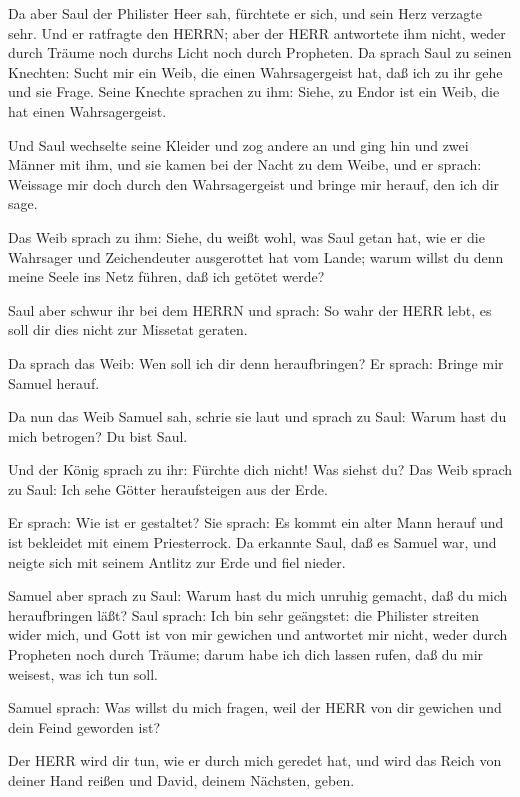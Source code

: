  Da aber Saul der Philister Heer sah, fürchtete er sich, und
sein Herz verzagte sehr.  Und er ratfragte den HERRN; aber
der HERR antwortete ihm nicht, weder durch Träume noch durchs Licht noch
durch Propheten.  Da sprach Saul zu seinen Knechten: Sucht
mir ein Weib, die einen Wahrsagergeist hat, daß ich zu ihr gehe und sie
Frage. Seine Knechte sprachen zu ihm: Siehe, zu Endor ist ein Weib, die
hat einen Wahrsagergeist.

 Und Saul wechselte seine Kleider und zog andere an und ging
hin und zwei Männer mit ihm, und sie kamen bei der Nacht zu dem Weibe,
und er sprach: Weissage mir doch durch den Wahrsagergeist und bringe mir
herauf, den ich dir sage.

 Das Weib sprach zu ihm: Siehe, du weißt wohl, was Saul
getan hat, wie er die Wahrsager und Zeichendeuter ausgerottet hat vom
Lande; warum willst du denn meine Seele ins Netz führen, daß ich getötet
werde?

 Saul aber schwur ihr bei dem HERRN und sprach: So wahr der
HERR lebt, es soll dir dies nicht zur Missetat geraten.

 Da sprach das Weib: Wen soll ich dir denn heraufbringen?
Er sprach: Bringe mir Samuel herauf.

 Da nun das Weib Samuel sah, schrie sie laut und sprach zu
Saul: Warum hast du mich betrogen? Du bist Saul.

 Und der König sprach zu ihr: Fürchte dich nicht! Was
siehst du? Das Weib sprach zu Saul: Ich sehe Götter heraufsteigen aus
der Erde.

 Er sprach: Wie ist er gestaltet? Sie sprach: Es kommt ein
alter Mann herauf und ist bekleidet mit einem Priesterrock. Da erkannte
Saul, daß es Samuel war, und neigte sich mit seinem Antlitz zur Erde und
fiel nieder.

 Samuel aber sprach zu Saul: Warum hast du mich unruhig
gemacht, daß du mich heraufbringen läßt? Saul sprach: Ich bin sehr
geängstet: die Philister streiten wider mich, und Gott ist von mir
gewichen und antwortet mir nicht, weder durch Propheten noch durch
Träume; darum habe ich dich lassen rufen, daß du mir weisest, was ich
tun soll.

 Samuel sprach: Was willst du mich fragen, weil der HERR
von dir gewichen und dein Feind geworden ist?

 Der HERR wird dir tun, wie er durch mich geredet hat, und
wird das Reich von deiner Hand reißen und David, deinem Nächsten, geben.

